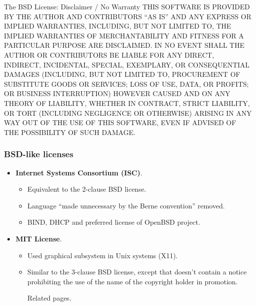 
\begin{frame}

\begin{block}{The BSD License: Disclaimer / No Warranty}
{\footnotesize
THIS SOFTWARE IS PROVIDED BY THE AUTHOR AND CONTRIBUTORS ``AS IS'' 
AND ANY EXPRESS OR IMPLIED WARRANTIES, INCLUDING, BUT NOT LIMITED TO, 
THE IMPLIED WARRANTIES OF MERCHANTABILITY AND FITNESS FOR A PARTICULAR 
PURPOSE ARE DISCLAIMED. IN NO EVENT SHALL THE AUTHOR OR CONTRIBUTORS 
BE LIABLE FOR ANY DIRECT, INDIRECT, INCIDENTAL, SPECIAL, EXEMPLARY, 
OR CONSEQUENTIAL DAMAGES (INCLUDING, BUT NOT LIMITED TO, PROCUREMENT 
OF SUBSTITUTE GOODS OR SERVICES; LOSS OF USE, DATA, OR PROFITS; 
OR BUSINESS INTERRUPTION) HOWEVER CAUSED AND ON ANY THEORY OF LIABILITY, 
WHETHER IN CONTRACT, STRICT LIABILITY, OR TORT (INCLUDING NEGLIGENCE 
OR OTHERWISE) ARISING IN ANY WAY OUT OF THE USE OF THIS SOFTWARE, 
EVEN IF ADVISED OF THE POSSIBILITY OF SUCH DAMAGE.
}
\end{block}
\end{frame}


\begin{frame}
\frametitle{BSD-like licenses}

\begin{itemize}

\item {\bf Internet Systems Consortium (ISC)}. 
	\begin{itemize}
	\item Equivalent to the 2-clause BSD license.
	\item Language ``made unnecessary by the Berne convention'' removed.
	\item BIND, DHCP and preferred license of OpenBSD project.
	\end{itemize}
\item {\bf MIT License}. 
	\begin{itemize}
	\item Used graphical subsystem in Unix systems (X11). 
	\item Similar to the 3-clause BSD license, except that doesn't contain a notice prohibiting the use of the name of the copyright holder in promotion.
     
     Related pages. 
	\end{itemize}
\end{itemize}

\end{frame}

